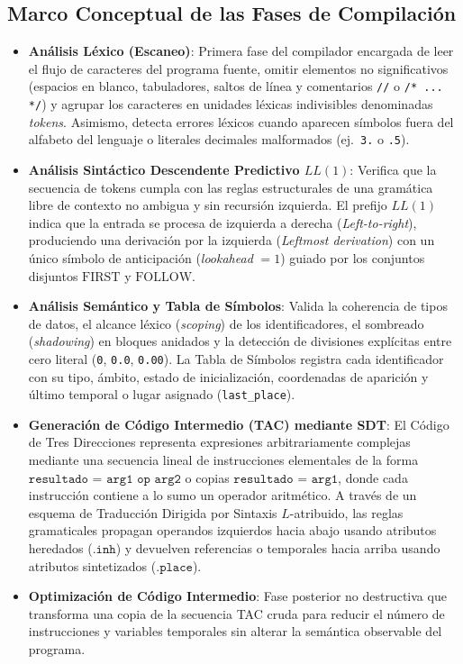 \documentclass[11pt, letterpaper]{article}
\begin{document}
\subsection{Marco Conceptual de las Fases de Compilación}

\begin{itemize}[leftmargin=1.6em]
    \item \textbf{Análisis Léxico (Escaneo)}: Primera fase del compilador encargada de leer el flujo de caracteres del programa fuente, omitir elementos no significativos (espacios en blanco, tabuladores, saltos de línea y comentarios \texttt{//} o \texttt{/* ... */}) y agrupar los caracteres en unidades léxicas indivisibles denominadas \textit{tokens}. Asimismo, detecta errores léxicos cuando aparecen símbolos fuera del alfabeto del lenguaje o literales decimales malformados (ej.\ \texttt{3.} o \texttt{.5}).
    \item \textbf{Análisis Sintáctico Descendente Predictivo $LL(1)$}: Verifica que la secuencia de tokens cumpla con las reglas estructurales de una gramática libre de contexto no ambigua y sin recursión izquierda. El prefijo $LL(1)$ indica que la entrada se procesa de izquierda a derecha (\textit{Left-to-right}), produciendo una derivación por la izquierda (\textit{Leftmost derivation}) con un único símbolo de anticipación (\textit{lookahead} $= 1$) guiado por los conjuntos disjuntos $\text{FIRST}$ y $\text{FOLLOW}$.
    \item \textbf{Análisis Semántico y Tabla de Símbolos}: Valida la coherencia de tipos de datos, el alcance léxico (\textit{scoping}) de los identificadores, el sombreado (\textit{shadowing}) en bloques anidados y la detección de divisiones explícitas entre cero literal (\texttt{0}, \texttt{0.0}, \texttt{0.00}). La Tabla de Símbolos registra cada identificador con su tipo, ámbito, estado de inicialización, coordenadas de aparición y último temporal o lugar asignado (\texttt{last\_place}).
    \item \textbf{Generación de Código Intermedio (TAC) mediante SDT}: El Código de Tres Direcciones representa expresiones arbitrariamente complejas mediante una secuencia lineal de instrucciones elementales de la forma $\texttt{resultado = arg1 op arg2}$ o copias $\texttt{resultado = arg1}$, donde cada instrucción contiene a lo sumo un operador aritmético. A través de un esquema de Traducción Dirigida por Sintaxis $L$-atribuido, las reglas gramaticales propagan operandos izquierdos hacia abajo usando atributos heredados ($\texttt{.inh}$) y devuelven referencias o temporales hacia arriba usando atributos sintetizados ($\texttt{.place}$).
    \item \textbf{Optimización de Código Intermedio}: Fase posterior no destructiva que transforma una copia de la secuencia TAC cruda para reducir el número de instrucciones y variables temporales sin alterar la semántica observable del programa.
\end{itemize}
\end{document}
